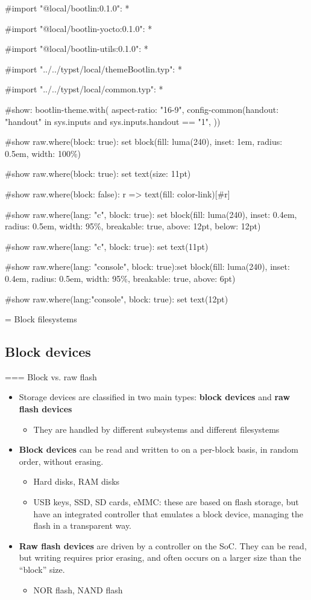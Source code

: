 #import "@local/bootlin:0.1.0": *

#import "@local/bootlin-yocto:0.1.0": *

#import "@local/bootlin-utils:0.1.0": *

#import "../../typst/local/themeBootlin.typ": *

#import "../../typst/local/common.typ": *

#show: bootlin-theme.with( aspect-ratio: "16-9", config-common(handout: "handout" in sys.inputs and sys.inputs.handout == "1", ))

#show raw.where(block: true): set block(fill: luma(240), inset: 1em, radius: 0.5em, width: 100\%)

#show raw.where(block: true): set text(size: 11pt)

#show raw.where(block: false): r => text(fill: color-link)[#r]

#show raw.where(lang: "c", block: true): set block(fill: luma(240), inset: 0.4em, radius: 0.5em, width: 95\%, breakable: true, above: 12pt, below: 12pt)

#show raw.where(lang: "c", block: true): set text(11pt)

#show raw.where(lang: "console", block: true):set block(fill: luma(240), inset: 0.4em, radius: 0.5em, width: 95\%, breakable: true, above: 6pt)

#show raw.where(lang:"console", block: true): set text(12pt)

 = Block filesystems

\subsection{Block devices}

=== Block vs. raw flash
  \begin{itemize}
  \item Storage devices are classified in two main types: {\bf block
      devices} and {\bf raw flash devices}
    \begin{itemize}
    \item They are handled by different subsystems and different
      filesystems
    \end{itemize}
  \item {\bf Block devices} can be read and written to on a per-block
    basis, in random order, without erasing.
    \begin{itemize}
    \item Hard disks, RAM disks
    \item USB keys, SSD, SD cards, eMMC: these are based
      on flash storage, but have an integrated controller that
      emulates a block device, managing the flash in a transparent
      way.
    \end{itemize}
  \item {\bf Raw flash devices} are driven by a controller on the
      SoC. They can be read, but writing requires prior erasing,
      and often occurs on a larger size than the “block” size.
    \begin{itemize}
    \item NOR flash, NAND flash
    \end{itemize}
  \end{itemize}


